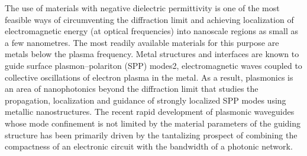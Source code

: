 The use of materials with negative dielectric permittivity is one of the most feasible ways of circumventing the diffraction limit and achieving localization of electromagnetic energy (at optical frequencies) into nanoscale regions as small as a few nanometres. The most readily available materials for this purpose are metals below the plasma frequency. Metal structures and interfaces are known to guide surface plasmon–polariton (SPP) modes2, electromagnetic waves coupled to collective oscillations of electron plasma in the metal. As a result, plasmonics is an area of nanophotonics beyond the diffraction limit that studies the propagation, localization and guidance of strongly localized SPP modes using metallic nanostructures. The recent rapid development of plasmonic waveguides whose mode confinement is not limited by the material parameters of the guiding structure has been primarily driven by the tantalizing prospect of combining the compactness of an electronic circuit with the bandwidth of a photonic network.





\pagebreak{}
